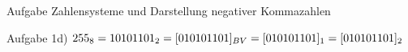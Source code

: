 \begin{frame}[allowframebreaks]{Aufgabe \thesection}{Zahlensysteme und Darstellung negativer Kommazahlen}
\begin{solution}
  \end{solution}
  \begin{solutionnoinc}
    Aufgabe 1d)\newline\newline
    $255_{8} = 10 101 101_2 \newline\newline = [010 101 101]_{BV} \newline\newline = [010 101 101]_{1} \newline\newline = [010 101 101]_{2}$
  \end{solutionnoinc}
\end{frame}
